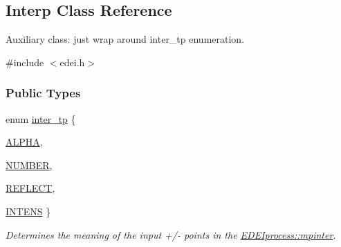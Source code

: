 \hypertarget{classInterp}{
\subsection{Interp Class Reference}
\label{classInterp}
}


Auxiliary class: just wrap around inter\_\-tp enumeration.  




{\ttfamily \#include $<$edei.h$>$}

\subsubsection*{Public Types}
\begin{DoxyCompactItemize}
\item 
enum \hyperlink{classInterp_a48f7a943f951c25a9717d1849cf7cd87}{inter\_\-tp} \{ \par
\hyperlink{classInterp_a48f7a943f951c25a9717d1849cf7cd87ac3491d178c3b4d99946346d29aa1a278}{ALPHA}, 
\par
\hyperlink{classInterp_a48f7a943f951c25a9717d1849cf7cd87ad059eb3ed702d77d4a397615966abe49}{NUMBER}, 
\par
\hyperlink{classInterp_a48f7a943f951c25a9717d1849cf7cd87addb4fb6c1edaa033ac3bd54e0f79f297}{REFLECT}, 
\par
\hyperlink{classInterp_a48f7a943f951c25a9717d1849cf7cd87aaaeebe62ae30762d4708f741e206fe91}{INTENS}
 \}
\begin{DoxyCompactList}\small\item\em Determines the meaning of the input +/-\/ points in the \hyperlink{classEDEIprocess_a1de13d8e88dc94c8627098298bc87667}{EDEIprocess::mpinter}. \item\end{DoxyCompactList}\end{DoxyCompactItemize}

